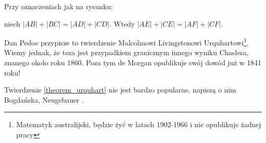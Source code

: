 %

\begin{theorem}[Urquharta]
\label{theorem_urquhart}%
%
    Przy oznaczeniach jak na rysunku:
    \begin{center}
\begin{comment}
    \begin{tikzpicture}[scale=.4]
        \tkzDefPoint(0, 0){E}
        \tkzDefPoint(267:5){E1}
        \tkzDefPoint(250:5){E2}
        \tkzDefPoint(165:5){E3}
        \tkzDefPoint(135:5){E4}
        
        \tkzDefLine[tangent at=E1](E) \tkzGetPoint{tan1}
        \tkzDefLine[tangent at=E2](E) \tkzGetPoint{tan2}
        \tkzDefLine[tangent at=E3](E) \tkzGetPoint{tan3}
        \tkzDefLine[tangent at=E4](E) \tkzGetPoint{tan4}
        
        \tkzInterLL(E4,tan4)(E1,tan1) \tkzGetPoint{S1}
        \tkzInterLL(E4,tan4)(E2,tan2) \tkzGetPoint{S2}
        \tkzInterLL(E3,tan3)(E1,tan1) \tkzGetPoint{S3}
        \tkzInterLL(E3,tan3)(E2,tan2) \tkzGetPoint{S4}

        \tkzInterLL(S3,S4)(S1,S2) \tkzGetPoint{Gorny}
        \tkzInterLL(S1,S3)(S2,S4) \tkzGetPoint{Dolny}

        \tkzLabelPoint[below](S1){$A$}
        \tkzLabelPoint[above left](S2){$D$}
        \tkzLabelPoint(S3){$B$}
        \tkzLabelPoint[above right](S4){$C$}
        \tkzLabelPoint(Dolny){$E$}
        \tkzLabelPoint[right](Gorny){$F$}

        \tkzDrawSegments[line width=0.2mm](S1,Dolny S1,Gorny S3,Gorny S2,Dolny)
        \tkzDrawPoints[size=3,color=black,fill=black!50](S1,S2,S3,S4,Dolny,Gorny)
\end{tikzpicture}
\end{comment}
    \end{center}
    niech $|AB| + |BC| = |AD| + |CD|$.
    Wtedy $|AE| + |CE| = |AF| + |CF|$.
\end{theorem}

Dan Pedoe \cite{pedoe_1976} przypisze to twierdzenie Malcolmowi Livingstonowi Urquhartowi\footnote{Matematyk australijski, będzie żyć w latach 1902-1966 i nie opublikuje żadnej pracy}.
%
%
Wiemy jednak, że teza jest przypadkiem granicznym innego wyniku Chaslesa, znanego około roku 1860.
Poza tym de Morgan opublikuje swój dowód już w 1841 roku!

Twierdzenie \ref{theorem_urquhart} nie jest bardzo popularne, napiszą o nim Bogdańska, Neugebauer \cite[s. 97]{neugebauer_2018}.

%